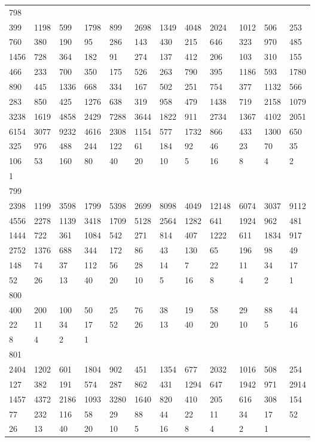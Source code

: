 \begin{longtable}{llllllllllll}
798&&&&&&&&&&&\\
399& 1198& 599& 1798& 899& 2698& 1349& 4048& 2024& 1012& 506& 253\\
760& 380& 190& 95& 286& 143& 430& 215& 646& 323& 970& 485\\
1456& 728& 364& 182& 91& 274& 137& 412& 206& 103& 310& 155\\
466& 233& 700& 350& 175& 526& 263& 790& 395& 1186& 593& 1780\\
890& 445& 1336& 668& 334& 167& 502& 251& 754& 377& 1132& 566\\
283& 850& 425& 1276& 638& 319& 958& 479& 1438& 719& 2158& 1079\\
3238& 1619& 4858& 2429& 7288& 3644& 1822& 911& 2734& 1367& 4102& 2051\\
6154& 3077& 9232& 4616& 2308& 1154& 577& 1732& 866& 433& 1300& 650\\
325& 976& 488& 244& 122& 61& 184& 92& 46& 23& 70& 35\\
106& 53& 160& 80& 40& 20& 10& 5& 16& 8& 4& 2\\
1& \\

799&&&&&&&&&&&\\
2398& 1199& 3598& 1799& 5398& 2699& 8098& 4049& 12148& 6074& 3037& 9112\\
4556& 2278& 1139& 3418& 1709& 5128& 2564& 1282& 641& 1924& 962& 481\\
1444& 722& 361& 1084& 542& 271& 814& 407& 1222& 611& 1834& 917\\
2752& 1376& 688& 344& 172& 86& 43& 130& 65& 196& 98& 49\\
148& 74& 37& 112& 56& 28& 14& 7& 22& 11& 34& 17\\
52& 26& 13& 40& 20& 10& 5& 16& 8& 4& 2& 1\\

800&&&&&&&&&&&\\
400& 200& 100& 50& 25& 76& 38& 19& 58& 29& 88& 44\\
22& 11& 34& 17& 52& 26& 13& 40& 20& 10& 5& 16\\
8& 4& 2& 1& \\

801&&&&&&&&&&&\\
2404& 1202& 601& 1804& 902& 451& 1354& 677& 2032& 1016& 508& 254\\
127& 382& 191& 574& 287& 862& 431& 1294& 647& 1942& 971& 2914\\
1457& 4372& 2186& 1093& 3280& 1640& 820& 410& 205& 616& 308& 154\\
77& 232& 116& 58& 29& 88& 44& 22& 11& 34& 17& 52\\
26& 13& 40& 20& 10& 5& 16& 8& 4& 2& 1& \\


\end{longtable}
